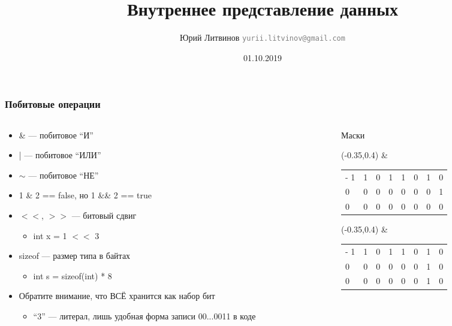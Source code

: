\documentclass[xetex,mathserif,serif]{beamer}
\title{Внутреннее представление данных}
\author[Юрий Литвинов]{Юрий Литвинов \newline \textcolor{gray}{\small\texttt{yurii.litvinov@gmail.com}}}
\date{01.10.2019}
\begin{document}
	
	\frame{\titlepage}
	
	\begin{frame}
		\frametitle{Побитовые операции}
		\begin{columns}
			\begin{column}{0.6\textwidth}
				\begin{itemize}
					\item \& --- побитовое ``И''
					\item | --- побитовое ``ИЛИ''
					\item $\sim$ --- побитовое ``НЕ''
					\item 1 \& 2 == false, но 1 \&\& 2 == true
					\item $<<$, $>>$ --- битовый сдвиг
					\begin{itemize}
						\item int x = 1 $<<$ 3
					\end{itemize}
					\item sizeof --- размер типа в байтах
					\begin{itemize}
						\item int s = sizeof(int) * 8
					\end{itemize}
					\item Обратите внимание, что ВСЁ хранится как набор бит
					\begin{itemize}
						\item ``3'' --- литерал, лишь удобная форма записи 00...0011 в коде
					\end{itemize}
				\end{itemize}
			\end{column}
			\begin{column}{0.4\textwidth}
				Маски
				\vspace{3mm}
				\begin{textblock}{1}(-0.35,0.4)
					\&
				\end{textblock}
				\begin{tabu} {| X[1 l p] | X[1 l p] | X[1 l p] | X[1 l p] | X[1 l p] | X[1 l p] | X[1 l p] | X[1 l p] |}
					\tabucline-
					\everyrow{\tabucline-}
					1 & 1 & 0 & 1 & 1 & 0 & 1 & 0 \\
					0 & 0 & 0 & 0 & 0 & 0 & 0 & 1 \\
					0 & 0 & 0 & 0 & 0 & 0 & 0 & 0 \\
				\end{tabu}
				\vspace{0.5cm}

				\begin{textblock}{1}(-0.35,0.4)
					\&
				\end{textblock}
				\begin{tabu} {| X[1 l p] | X[1 l p] | X[1 l p] | X[1 l p] | X[1 l p] | X[1 l p] | X[1 l p] | X[1 l p] |}
					\tabucline-
					\everyrow{\tabucline-}
					1 & 1 & 0 & 1 & 1 & 0 & 1 & 0 \\
					0 & 0 & 0 & 0 & 0 & 0 & 1 & 0 \\
					0 & 0 & 0 & 0 & 0 & 0 & 1 & 0 \\
				\end{tabu}
			\end{column}
		\end{columns}
	\end{frame}
\end{document}
